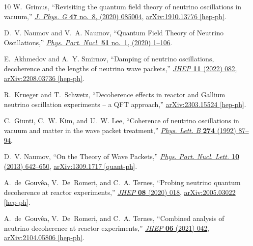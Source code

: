 \documentclass[aps, prd, onecolumn, tightenlines, notitlepage, superscriptaddress, nofootinbib, preprintnumbers, floatfix,showkeys,11pt]{revtex4-2}
\begin{document}
\begin{thebibliography}{10}
W.~Grimus, ``{Revisiting the quantum field theory of neutrino oscillations in
  vacuum},'' \href{http://dx.doi.org/10.1088/1361-6471/ab716f}{{\em J. Phys. G}
  {\bfseries 47} no.~8, (2020) 085004},
  \href{http://arxiv.org/abs/1910.13776}{{\ttfamily arXiv:1910.13776
  [hep-ph]}}.

D.~V. Naumov and V.~A. Naumov, ``{Quantum Field Theory of Neutrino
  Oscillations},'' \href{http://dx.doi.org/10.1134/S1063779620010050}{{\em
  Phys. Part. Nucl.} {\bfseries 51} no.~1, (2020) 1--106}.

E.~Akhmedov and A.~Y. Smirnov, ``{Damping of neutrino oscillations, decoherence
  and the lengths of neutrino wave packets},''
  \href{http://dx.doi.org/10.1007/JHEP11(2022)082}{{\em JHEP} {\bfseries 11}
  (2022) 082}, \href{http://arxiv.org/abs/2208.03736}{{\ttfamily
  arXiv:2208.03736 [hep-ph]}}.

R.~Krueger and T.~Schwetz, ``{Decoherence effects in reactor and Gallium
  neutrino oscillation experiments -- a QFT approach},''
  \href{http://arxiv.org/abs/2303.15524}{{\ttfamily arXiv:2303.15524
  [hep-ph]}}.

C.~Giunti, C.~W. Kim, and U.~W. Lee, ``{Coherence of neutrino oscillations in
  vacuum and matter in the wave packet treatment},''
  \href{http://dx.doi.org/10.1016/0370-2693(92)90308-Q}{{\em Phys. Lett. B}
  {\bfseries 274} (1992) 87--94}.

D.~V. Naumov, ``{On the Theory of Wave Packets},''
  \href{http://dx.doi.org/10.1134/S1547477113070145}{{\em Phys. Part. Nucl.
  Lett.} {\bfseries 10} (2013) 642--650},
  \href{http://arxiv.org/abs/1309.1717}{{\ttfamily arXiv:1309.1717
  [quant-ph]}}.

A.~de~Gouvêa, V.~De~Romeri, and C.~A. Ternes, ``{Probing neutrino quantum
  decoherence at reactor experiments},''
  \href{http://dx.doi.org/10.1007/JHEP08(2020)049}{{\em JHEP} {\bfseries 08}
  (2020) 018}, \href{http://arxiv.org/abs/2005.03022}{{\ttfamily
  arXiv:2005.03022 [hep-ph]}}.

A.~de~Gouv\^ea, V.~De~Romeri, and C.~A. Ternes, ``{Combined analysis of
  neutrino decoherence at reactor experiments},''
  \href{http://dx.doi.org/10.1007/JHEP06(2021)042}{{\em JHEP} {\bfseries 06}
  (2021) 042}, \href{http://arxiv.org/abs/2104.05806}{{\ttfamily
  arXiv:2104.05806 [hep-ph]}}.


\end{thebibliography}
\end{document}
